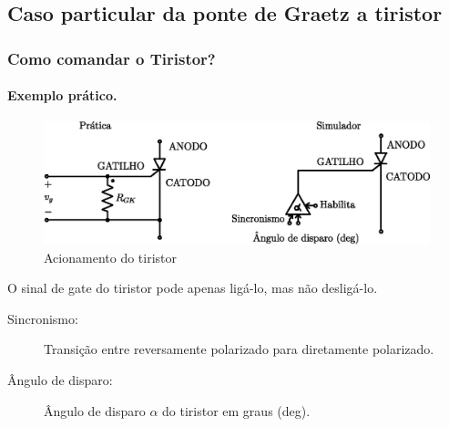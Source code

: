 \documentclass[aspectratio=43]{beamer}
\begin{document}
\subsection{Caso particular da ponte de Graetz a tiristor}
\begin{frame}
	\frametitle{Como comandar o Tiristor?}
	\framesubtitle{Exemplo prático.}

\begin{figure}
	\centering
	\includegraphics[width=0.8\linewidth]{figuras/TiristorPulsoGate}
	\caption{Acionamento do tiristor}
	\label{fig:TiristorPulsoGate}
\end{figure}

	\begin{block}{O sinal de gate do tiristor pode apenas ligá-lo, mas não desligá-lo.}
		\begin{description}
			\item[Sincronismo:] Transição entre reversamente polarizado para diretamente polarizado.
			\item[Ângulo de disparo:] Ângulo de disparo $\alpha$ do tiristor em graus (deg).
		\end{description}
	\end{block}
\end{frame}
\end{document}
